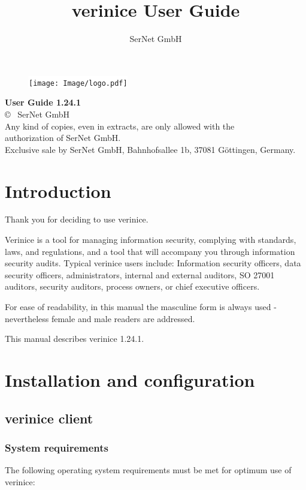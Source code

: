 \documentclass[a4paper,10pt]{book}
\title{verinice User Guide \vnversion{}}
\author{SerNet GmbH}
\newcommand*{\vnversion}{1.24.1}
\begin{document}

\begin{titlepage}
    \centering
    \vspace{1cm}
    \begin{figure}[htb!]
      \centering
      \colorbox{white}{\texttt{[image: Image/logo.pdf]}}
    \end{figure}
    \huge\textbf{User Guide \vnversion{}}\\
    \vspace{14cm}
    \normalsize
  \copyright{} \the\year\ SerNet GmbH\\
  Any kind of copies, even in extracts, are only allowed with the\\
  authorization of SerNet GmbH.\\
  Exclusive sale by SerNet GmbH, Bahnhofsallee 1b, 37081 Göttingen, Germany.
\end{titlepage}

\tableofcontents

\listoftables

\listoffigures

\chapter{Introduction}
Thank you for deciding to use verinice.

Verinice is a tool for managing information security, complying with standards,
laws, and regulations, and a tool that will accompany you through information
security audits. Typical verinice users include: Information security officers,
data security officers, administrators, internal and external auditors,
SO 27001 auditors, security auditors, process owners, or chief executive
officers.

For ease of readability, in this manual the masculine form is always used -
nevertheless female and male readers are addressed.

This manual describes verinice \vnversion{}.

\newpage
\chapter{Installation and configuration}
\section{verinice client}
\subsection{System requirements}
The following operating system requirements must be met for optimum use of
verinice:
\end{document}
